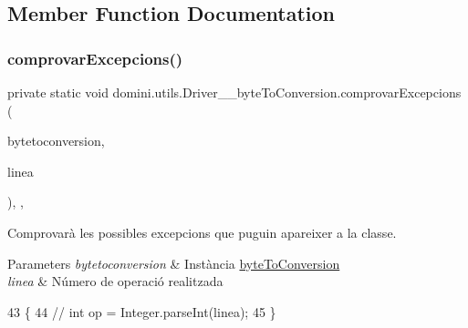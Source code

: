 \subsection{Member Function Documentation}
\mbox{\label{classdomini_1_1utils_1_1Driver____byteToConversion_a82c589da57bedb139b9254c8623a7fd4}} 
\subsubsection{\texorpdfstring{comprovar\+Excepcions()}{comprovarExcepcions()}}
{\footnotesize\ttfamily private static void domini.\+utils.\+Driver\+\_\+\+\_\+byte\+To\+Conversion.\+comprovar\+Excepcions (\begin{DoxyParamCaption}\item[{\hyperlink{classdomini_1_1utils_1_1byteToConversion}{byte\+To\+Conversion}}]{bytetoconversion,  }\item[{String}]{linea }\end{DoxyParamCaption})\hspace{0.3cm}{\ttfamily [inline]}, {\ttfamily [static]}, {\ttfamily [private]}}



Comprovarà les possibles excepcions que puguin apareixer a la classe. 


\begin{DoxyParams}{Parameters}
{\em bytetoconversion} & Instància \hyperlink{classdomini_1_1utils_1_1byteToConversion}{byte\+To\+Conversion} \\
\hline
{\em linea} & Número de operació realitzada \\
\hline
\end{DoxyParams}

\begin{DoxyCode}
43                                                                                             \{
44         \textcolor{comment}{// int op = Integer.parseInt(linea);}
45     \}
\end{DoxyCode}
\mbox{\label{classdomini_1_1utils_1_1Driver____byteToConversion_a19510acac17ad211538d878b4de039b8}} 
